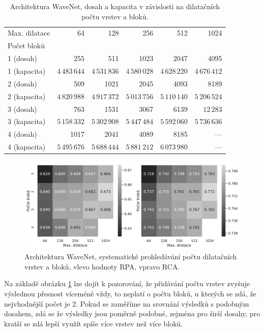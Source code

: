 \begin{table}[h!]
\centering
    \begin{tabular}{lrrrrr}
    \toprule
    Max. dilatace & 64 & 128 & 256 & 512 & 1024 \\
    Počet bloků   & {} & {}  & {}  & {}  & {}  \\
    \midrule
    1 (dosah) & 255  & 511  & 1023 & 2047 & 4095 \\
    1 (kapacita) & $4\,483\,644$  & $4\,531\,836$ & $4\,580\,028$ & $4\,628\,220$ & $4\,676\,412$ \\
    2 (dosah) & 509  & 1021 & 2045 & 4093 & 8189 \\
    2 (kapacita) & $4\,820\,988$  & $4\,917\,372$ & $5\,013\,756$ & $5\,110\,140$ & $5\,206\,524$ \\
    3 (dosah) & 763  & 1531 & 3067 & 6139 & $12\,283$ \\
    3 (kapacita) & $5\,158\,332$  & $5\,302\,908$ & $5\,447\,484$ & $5\,592\,060$ & $5\,736\,636$ \\
    4 (dosah) & 1017 & 2041 & 4089 & 8185 & --- \\
    4 (kapacita) & $5\,495\,676$  & $5\,688\,444$ & $5\,881\,212$ & $6\,073\,980$ & --- \\
    \bottomrule
    \end{tabular}
\caption{Architektura WaveNet, dosah a kapacita v závislosti na dilatačních počtu vrstev a bloků.}\label{tab:wavenet_dilation_width_numbers}
\end{table}

\begin{figure}[h]\centering
    \includegraphics[scale=0.5]{../img/figures/wavenet_stacks_gridsearch_grey}
\caption{Architektura WaveNet, systematické prohledávání počtu dilatačních vrstev a bloků, vlevo hodnoty RPA, vpravo RCA.}\label{obr:wavenet_stacks_gridsearch}
\end{figure}

Na základě obrázku \ref{obr:wavenet_stacks_gridsearch} lze dojít k pozorování, že přidávání počtu vrstev zvyšuje výslednou přesnost víceméně vždy, to neplatí o počtu bloků, u kterých se zdá, že nejvhodnější počet je 2. Pokud se zaměříme na srovnání výsledků s podobným dosahem, zdá se že výsledky jsou poměrně podobné, zejména pro širší dosahy, pro kratší se zdá lepší využít spíše více vrstev než více bloků. 

